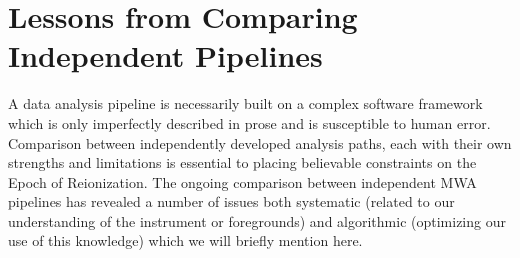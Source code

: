 \documentclass[twolcolumn,iop]{emulateapj}
\def\chipscite{Trott et al 2015}
\def\dilloncite{Dillon et al 2015 }
\begin{document}


\section{Lessons from Comparing Independent Pipelines}
\label{sec:lessons}
      A data analysis pipeline is necessarily built on a complex software framework which is only imperfectly described in prose and is susceptible to human error.  Comparison between independently developed analysis paths, each with their own strengths and limitations is essential to placing believable constraints on the Epoch of Reionization. The ongoing comparison between independent MWA pipelines has revealed a number of issues both systematic (related to our understanding of the instrument or foregrounds) and algorithmic (optimizing our use of this knowledge) which we will briefly mention here.
      
\end{document}
